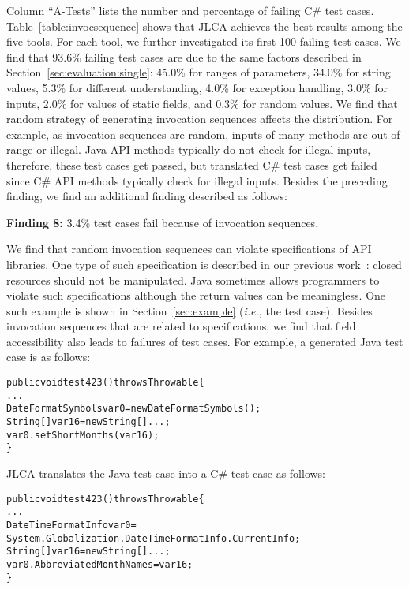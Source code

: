 Column ``A-Tests'' lists the number and percentage of failing C\# test cases. Table~\ref{table:invocsequence} shows that JLCA achieves the best results among the five tools. For each tool, we further investigated its first 100 failing test cases. We find that 93.6\% failing test cases are due to the same factors described in Section~\ref{sec:evaluation:single}: 45.0\% for ranges of parameters, 34.0\% for string values, 5.3\% for different understanding, 4.0\% for exception handling, 3.0\% for  inputs, 2.0\% for values of static fields, and 0.3\% for random values. We find that random strategy of generating invocation sequences affects the distribution. For example, as invocation sequences are random, inputs of many methods are out of range or illegal. Java API methods typically do not check for illegal inputs, therefore, these test cases get passed, but translated C\# test cases get failed since C\# API methods typically check for illegal inputs. Besides the preceding finding, we find an additional finding described as follows:

\textbf{Finding 8:} 3.4\% test cases fail because of invocation sequences.


We find that random invocation sequences can violate specifications of API libraries. One type of such specification is described in our previous work~\cite{zhong09:inferring}: closed resources should not be manipulated. Java sometimes allows programmers to violate such specifications although the return values can be meaningless. One such example is shown in Section~\ref{sec:example} (\emph{i.e.}, the  test case). Besides invocation sequences that are related to specifications, we find that field accessibility also leads to failures of test cases. For example, a generated Java test case is as follows:

\begin{CodeOut}\vspace*{-1ex}
\begin{alltt}
public void test423() throws Throwable\{
  ...
  DateFormatSymbols var0=new DateFormatSymbols();
  String[] var16=new String[]{...};
  var0.setShortMonths(var16);
\}
\end{alltt}
\end{CodeOut}\vspace*{-2ex}

JLCA translates the Java test case into a C\# test case as follows:

\begin{CodeOut}\vspace*{-1ex}
\begin{alltt}
public void test423() throws Throwable\{
  ...
  DateTimeFormatInfo var0 =
  System.Globalization.DateTimeFormatInfo.CurrentInfo;
  String[] var16=new String[]{...};
  var0.AbbreviatedMonthNames = var16;
\}
\end{alltt}
\end{CodeOut}\vspace*{-2ex}

